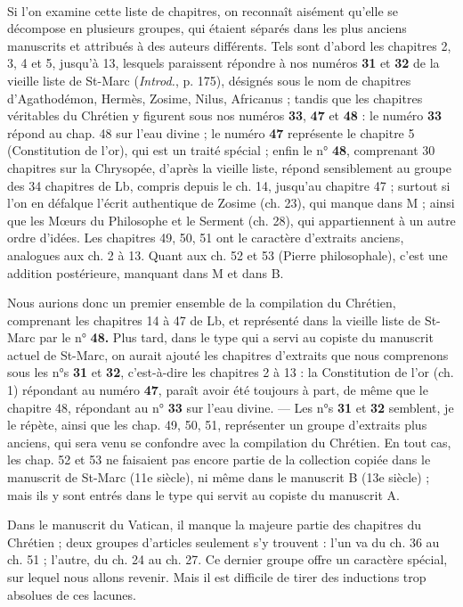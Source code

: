 \documentclass[a4paper, 11pt, oneside, polutonikogreek, french]{article}
\begin{document}
\paragraph{}
Si l'on examine cette liste de chapitres, on reconnaît aisément qu'elle se décompose en plusieurs groupes, qui étaient séparés dans les plus anciens manuscrits et attribués à des auteurs différents. Tels sont d'abord les chapitres 2, 3, 4 et 5, jusqu'à 13, lesquels paraissent répondre à nos numéros \textbf{31} et \textbf{32} de la vieille liste de St-Marc (\emph{Introd.}, p. 175), désignés sous le nom de chapitres d'Agathodémon, Hermès, Zosime, Nilus, Africanus ; tandis que les chapitres véritables du Chrétien y figurent sous nos numéros \textbf{33}, \textbf{47} et \textbf{48} : le numéro \textbf{33} répond au chap. 48 sur l'eau divine ; le numéro \textbf{47} représente le chapitre 5 (Constitution de l'or), qui est un traité spécial ; enfin le n° \textbf{48}, comprenant 30 chapitres sur la Chrysopée, d'après la vieille liste, répond sensiblement au groupe des 34 chapitres de Lb, compris depuis le ch. 14, jusqu'au chapitre 47 ; surtout si l'on en défalque l'écrit authentique de Zosime (ch. 23), qui manque dans M ; ainsi que les Mœurs du Philosophe et le Serment (ch. 28), qui appartiennent à un autre ordre d'idées. Les chapitres 49, 50, 51 ont le caractère d'extraits anciens, analogues aux ch. 2 à 13. Quant aux ch. 52 et 53 (Pierre philosophale), c'est une addition postérieure, manquant dans M et dans B.

Nous aurions donc un premier ensemble de la compilation du Chrétien, comprenant les chapitres 14 à 47 de Lb, et représenté dans la vieille liste de St-Marc par le n° \textbf{48.} Plus tard, dans le type qui a servi au copiste du manuscrit actuel de St-Marc, on aurait ajouté les chapitres d'extraits que nous comprenons sous les n°s \textbf{31} et \textbf{32}, c'est-à-dire les chapitres 2 à 13 : la Constitution de l'or (ch. 1) répondant au numéro \textbf{47}, paraît avoir été toujours à part, de même que le chapitre 48, répondant au n° \textbf{33} sur l'eau divine. --- Les n°s \textbf{31} et \textbf{32} semblent, je le répète, ainsi que les chap. 49, 50, 51, représenter un groupe d'extraits plus anciens, qui sera venu se confondre avec la compilation du Chrétien. En tout cas, les chap. 52 et 53 ne faisaient pas encore partie de la collection copiée dans le manuscrit de St-Marc (11e siècle), ni même dans le manuscrit B (13e siècle) ; mais ils y sont entrés dans le type qui servit au copiste du manuscrit A.

Dans le manuscrit du Vatican, il manque la majeure partie des chapitres du Chrétien ; deux groupes d'articles seulement s'y trouvent : l'un va du ch. 36 au ch. 51 ; l'autre, du ch. 24 au ch. 27. Ce dernier groupe offre un caractère spécial, sur lequel nous allons revenir. Mais il est difficile de tirer des inductions trop absolues de ces lacunes.
\end{document}
